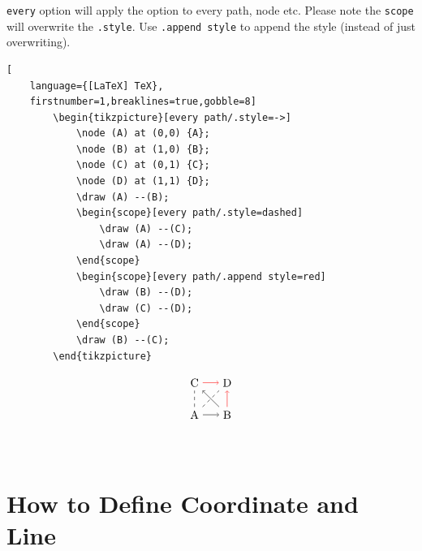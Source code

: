 \documentclass[lualatex]{jlreq}
\begin{document}
\verb|every| option will apply the option to every path, node etc. Please note the \verb|scope| will overwrite the \verb|.style|. Use \verb|.append style| to append the style (instead of just overwriting).
\\[1em]
\begin{minipage}{0.78 \textwidth}
    \begin{lstlisting}[
    language={[LaTeX] TeX},
    firstnumber=1,breaklines=true,gobble=8]
        \begin{tikzpicture}[every path/.style=->]
            \node (A) at (0,0) {A};
            \node (B) at (1,0) {B};
            \node (C) at (0,1) {C};
            \node (D) at (1,1) {D};
            \draw (A) --(B);
            \begin{scope}[every path/.style=dashed]
                \draw (A) --(C);
                \draw (A) --(D);
            \end{scope}
            \begin{scope}[every path/.append style=red]
                \draw (B) --(D);
                \draw (C) --(D);
            \end{scope}
            \draw (B) --(C);
        \end{tikzpicture}
    \end{lstlisting}
\end{minipage}
\hfill
\begin{minipage}{0.18 \textwidth}
    \[
        \begin{tikzpicture}[every path/.style=->]
            \node (A) at (0,0) {A};
            \node (B) at (1,0) {B};
            \node (C) at (0,1) {C};
            \node (D) at (1,1) {D};
            \draw (A) --(B);
            \begin{scope}[every path/.style=dashed]
                \draw (A) --(C);
                \draw (A) --(D);
            \end{scope}
            \begin{scope}[every path/.append style=red]
                \draw (B) --(D);
                \draw (C) --(D);
            \end{scope}
            \draw (B) --(C);
        \end{tikzpicture}
    \]
\end{minipage}
\\[1em]

\section{How to Define Coordinate and Line}
\label{sec:coordinate}
\end{document}
